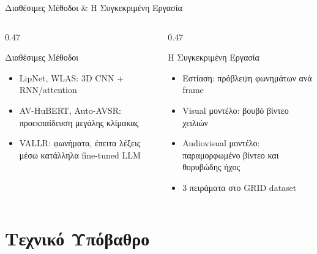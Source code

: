 \documentclass[aspectratio=169,10pt,xcolor=table]{beamer}
\begin{document}
\begin{frame}{Διαθέσιμες Μέθοδοι \& Η Συγκεκριμένη Εργασία}
  \small
  \begin{columns}[T]
    \begin{column}{0.47\textwidth}
      \begin{block}{Διαθέσιμες Μέθοδοι}
        \begin{itemize}
          \item LipNet, WLAS: 3D CNN + RNN/attention
          \item AV-HuBERT, Auto-AVSR: προεκπαίδευση μεγάλης κλίμακας
          \item VALLR: φωνήματα, έπειτα λέξεις μέσω κατάλληλα fine-tuned LLM
        \end{itemize}
      \end{block}
    \end{column}
    \begin{column}{0.47\textwidth}
      \begin{block}{Η Συγκεκριμένη Εργασία}
        \begin{itemize}
          \item Εστίαση: πρόβλεψη φωνημάτων ανά frame
          \item Visual μοντέλο: βουβό βίντεο χειλιών
          \item Audiovisual μοντέλο: παραμορφωμένο βίντεο και θορυβώδης ήχος
          \item 3 πειράματα στο GRID dataset
        \end{itemize}
      \end{block}
    \end{column}
  \end{columns}
  \vfill
  \centering
\end{frame}

\section{Τεχνικό Υπόβαθρο}
\end{document}
